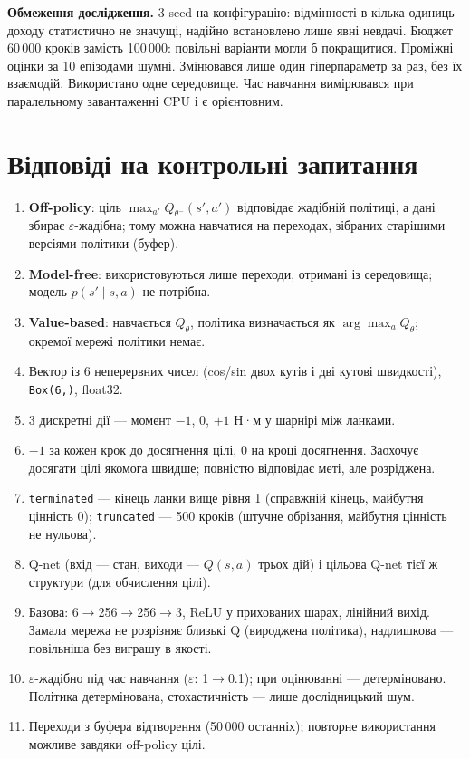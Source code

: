 \documentclass[11pt,a4paper]{article}
\newcommand{\code}[1]{\texttt{#1}}
\begin{document}
\textbf{Обмеження дослідження.} 3 seed на конфігурацію: відмінності в кілька одиниць доходу статистично не значущі, надійно встановлено лише явні невдачі. Бюджет 60\,000 кроків замість 100\,000: повільні варіанти могли б покращитися. Проміжні оцінки за 10 епізодами шумні. Змінювався лише один гіперпараметр за раз, без їх взаємодій. Використано одне середовище. Час навчання вимірювався при паралельному завантаженні CPU і є орієнтовним.

\appendix
\section{Відповіді на контрольні запитання}
\begin{enumerate}[leftmargin=*]
\item \textbf{Off-policy}: ціль $\max_{a'}Q_{\theta^-}(s',a')$ відповідає жадібній політиці, а дані збирає $\varepsilon$-жадібна; тому можна навчатися на переходах, зібраних старішими версіями політики (буфер).
\item \textbf{Model-free}: використовуються лише переходи, отримані із середовища; модель $p(s'\mid s,a)$ не потрібна.
\item \textbf{Value-based}: навчається $Q_\theta$, політика визначається як $\arg\max_aQ_\theta$; окремої мережі політики немає.
\item Вектор із 6 неперервних чисел (cos/sin двох кутів і дві кутові швидкості), \code{Box(6,)}, float32.
\item 3 дискретні дії — момент $-1$, $0$, $+1$ Н·м у шарнірі між ланками.
\item $-1$ за кожен крок до досягнення цілі, $0$ на кроці досягнення. Заохочує досягати цілі якомога швидше; повністю відповідає меті, але розріджена.
\item \code{terminated} — кінець ланки вище рівня 1 (справжній кінець, майбутня цінність 0); \code{truncated} — 500 кроків (штучне обрізання, майбутня цінність не нульова).
\item Q-net (вхід — стан, виходи — $Q(s,a)$ трьох дій) і цільова Q-net тієї ж структури (для обчислення цілі).
\item Базова: 6$\to$256$\to$256$\to$3, ReLU у прихованих шарах, лінійний вихід. Замала мережа не розрізняє близькі Q (вироджена політика), надлишкова — повільніша без виграшу в якості.
\item $\varepsilon$-жадібно під час навчання ($\varepsilon$: 1$\to$0.1); при оцінюванні — детерміновано. Політика детермінована, стохастичність — лише дослідницький шум.
\item Переходи з буфера відтворення (50\,000 останніх); повторне використання можливе завдяки off-policy цілі.

\end{enumerate}
\end{document}
